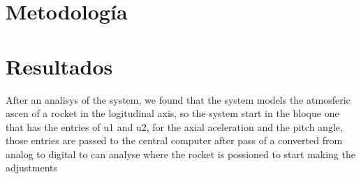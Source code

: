 \documentclass[article, 11pt]{IEEEtran}   %
\begin{document}
\section{Metodolog\'ia}
\lipsum[1-2]

\section {Resultados}
After an analisys of the system, we found that the system models the atmosferic ascen of a rocket in the logitudinal axis, so the system start in the bloque one that has the entries of u1 and u2, for the axial aceleration and the pitch angle, those entries are passed to the central computer after pass of a converted from analog to digital to can analyse where the rocket is possioned to start making the adjustments
\end{document}
